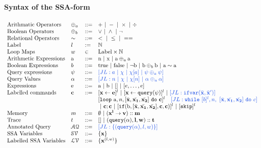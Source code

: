 \documentclass[a4paper,11pt]{article}
\begin{document}
\paragraph{Syntax of the SSA-form}
\[
\begin{array}{llll}
 \mbox{Arithmatic Operators} & \oplus_a & ::= & + ~|~ - ~|~ \times 
%
~|~ \div \\  
  \mbox{Boolean Operators} & \oplus_b & ::= & \lor ~|~ \land ~|~ \neg\\
   \mbox{Relational Operators} & \sim & ::= & < ~|~ \leq ~|~ == \\  
 \mbox{Label} & l & := & \mathbb{N} \\ 
 \mbox{Loop Maps} & w & \in & \mbox{Label} \times \mathbb{N} \\
\mbox{Arithmetic Expressions} & \saexpr & ::= & 
	\textrm{n} ~|~ \textrm{x} ~|~ \saexpr \oplus_a \saexpr  \\
\mbox{Boolean Expressions} & \bexpr & ::= & 
	\textrm{true} ~|~ \textrm{false}  ~|~ \neg \sbexpr
	 ~|~ \sbexpr \oplus_b \sbexpr
	~|~ \saexpr \sim \saexpr 
	\\
\mbox{Query expressions} & \qexpr & ::= 
& \jl{ \aexpr ~|~ \chi ~|~ \chi[\aexpr] ~|~ \qexpr \oplus_a \qexpr} 
\\
\mbox{Query Values} & \qval & ::= 
& \jl{ n ~|~ \chi ~|~ \chi[n] ~|~ \qval \oplus_a  \qval }
\\
\mbox{Expressions} & \sexpr & ::= & \saexpr \sep \sbexpr ~|~ [] ~|~ [\expr, \dots, \expr]
\\	
\mbox{Labelled commands} & \ssa{c} & ::= &   [\assign {\ssa{x}}{ \ssa{\expr}}]^{l} ~|~  [\assign {\ssa{x} } {\ssa{\query(\qexpr)}}]^{l}
%
~|~  {\jl{\eifvar(\bar{\ssa{x}}, \bar{\ssa{x}}')}} \\ 
&&& 
[\eloop ~ \saexpr, n, [\bar{\ssa{x}}, \bar{\ssa{x_1}}, \bar{\ssa{x_2}}] ~ \edo ~ \ssa{c} ]^{l} 
~~~
\jl{\ewhile ~ [ b ]^{l} , n,
~ 
[\bar{\ssa{x}}, \bar{\ssa{x_1}}, \bar{\ssa{x_2}}] 
~ \edo ~  c }
\\
&&&
~|~ \ssa{c};\ssa{c}  
~|~ [\eif(\sbexpr, [\bar{\ssa{x}}, \bar{\ssa{x_1}}, \bar{\ssa{x_2}}] , \ssa{c}, \ssa{c})]^l 
~|~ [\eskip]^{l} \\
\mbox{Memory} & m & ::= & \emptyset ~|~ \ssa{ ({x^{l}} \to v) :: m } \\
%
\mbox{Trace} & t & ::= & [] ~|~ \ssa{{(\query(\qval), l , w ) :: t}} \\
\mbox{Annotated Query} & \mathcal{AQ}  & 
::= & \jl{\{ (\query(\qval), l , w )  \} }
 \\
\mbox{SSA Variables} & \mathcal{SV}  & ::= & \{ \ssa{x} \} \\
\mbox{Labelled SSA Variables} & \mathcal{LV}  & ::= & \{ \ssa{x}^{(l,w)}  \}
\end{array}
\]
\end{document}

